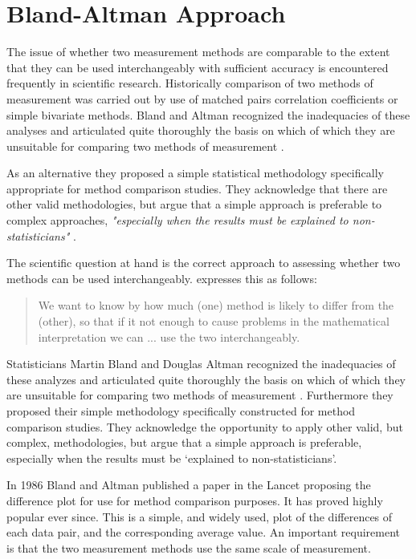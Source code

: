 \documentclass[Main.tex]{subfiles}
\begin{document}
	\section{Bland-Altman Approach}

The issue of whether two measurement methods are comparable to the extent that they can be used interchangeably with sufficient accuracy is encountered frequently in scientific research. Historically comparison of two methods of measurement was carried
out by use of matched pairs correlation coefficients or simple bivariate methods. Bland and Altman recognized the inadequacies of these analyses and articulated quite thoroughly the basis on which of which they are unsuitable for comparing two methods of measurement \citep*{BA83}.
	
As an alternative they proposed a simple statistical methodology specifically appropriate for method comparison studies. They acknowledge that there are other valid methodologies, but argue that a simple approach is preferable to complex approaches,	\emph{"especially when the results must be explained to non-statisticians"} \citep*{BA83}.

The scientific question at hand is the correct approach to
assessing whether two methods can be used interchangeably.
\citet{BA99} expresses this as follows:
\begin{quote}We want to
	know by how much (one) method is likely to differ from the
	(other), so that if it not enough to cause problems in the
	mathematical interpretation we can ... use the two
	interchangeably.
\end{quote}


Statisticians Martin Bland and Douglas Altman recognized the inadequacies of these analyzes and
articulated quite thoroughly the basis on which of which they are unsuitable for comparing two methods of measurement \citep*{BA83}. Furthermore they proposed their simple methodology specifically constructed for method comparison studies. They acknowledge the opportunity to apply other valid, but complex, methodologies, but argue that a simple approach is preferable, especially when the results must be `explained to non-statisticians'.


In 1986 Bland and Altman published a paper in the Lancet proposing the difference plot for use for method comparison purposes. It has
proved highly popular ever since. This is a simple, and widely used, plot of the differences of each data pair, and the corresponding average value. An important requirement is that the two measurement methods use the same scale of measurement.
\end{document}
